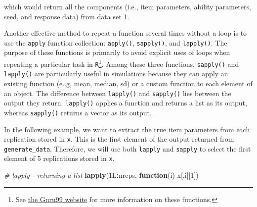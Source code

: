 \documentclass[
]{book}
\newenvironment{Shaded}{\begin{snugshade}}{\end{snugshade}}
\newcommand{\CommentTok}[1]{\textcolor[rgb]{0.56,0.35,0.01}{\textit{#1}}}
\newcommand{\ControlFlowTok}[1]{\textcolor[rgb]{0.13,0.29,0.53}{\textbf{#1}}}
\newcommand{\DecValTok}[1]{\textcolor[rgb]{0.00,0.00,0.81}{#1}}
\newcommand{\KeywordTok}[1]{\textcolor[rgb]{0.13,0.29,0.53}{\textbf{#1}}}
\newcommand{\NormalTok}[1]{#1}
\newcommand{\OperatorTok}[1]{\textcolor[rgb]{0.81,0.36,0.00}{\textbf{#1}}}
\begin{document}
which would return all the components (i.e., item parameters, ability parameters, seed, and response data) from data set 1.

Another effective method to repeat a function several times without a loop is to use the \texttt{apply} function collection: \texttt{apply()}, \texttt{sapply()}, and \texttt{lapply()}. The purpose of these functions is primarily to avoid explicit uses of loops when repeating a particular task in \texttt{R}\footnote{See \href{https://www.guru99.com/r-apply-sapply-tapply.html}{the Guru99 website} for more information on these functions.}. Among these three functions, \texttt{sapply()} and \texttt{lapply()} are particularly useful in simulations because they can apply an existing function (e..g, mean, median, sd) or a custom function to each element of an object. The difference between \texttt{lapply()} and \texttt{sapply()} lies between the output they return. \texttt{lapply()} applies a function and returns a list as its output, whereas \texttt{sapply()} returns a vector as its output.

In the following example, we want to extract the true item parameters from each replication stored in \texttt{x}. This is the first element of the output returned from \texttt{generate\_data}. Therefore, we will use both \texttt{lapply} and \texttt{sapply} to select the first element of 5 replications stored in \texttt{x}.

\begin{Shaded}
\begin{Highlighting}[]
\CommentTok{# lapply - returning a list}
\KeywordTok{lapply}\NormalTok{(1L}\OperatorTok{:}\NormalTok{nreps, }\ControlFlowTok{function}\NormalTok{(i) x[,i][}\DecValTok{1}\NormalTok{])}
\end{Highlighting}
\end{Shaded}
\end{document}
